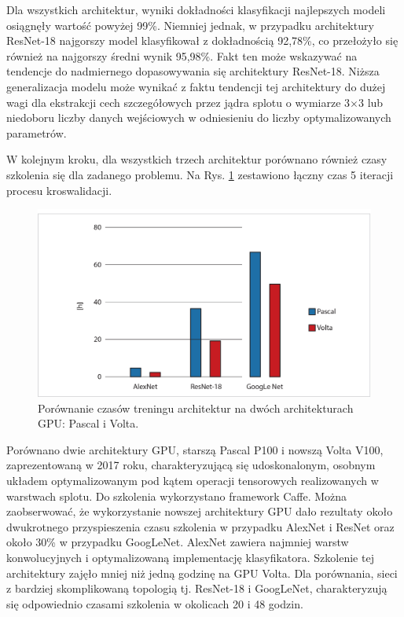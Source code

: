 Dla wszystkich architektur, wyniki dokładności klasyfikacji najlepszych modeli osiągnęły wartość powyżej 99\%. Niemniej jednak, w przypadku architektury ResNet-18 najgorszy model klasyfikował z dokładnością 92,78\%, co przełożyło się również na najgorszy średni wynik 95,98\%. Fakt ten może wskazywać na tendencje do nadmiernego dopasowywania się architektury ResNet-18. Niższa generalizacja modelu może wynikać z faktu tendencji tej architektury do dużej wagi dla ekstrakcji cech szczegółowych przez jądra splotu o wymiarze 3$\times$3 lub niedoboru liczby danych wejściowych w odniesieniu do liczby optymalizowanych parametrów.

W kolejnym kroku, dla wszystkich trzech architektur porównano również czasy szkolenia się dla zadanego problemu. Na Rys. \ref{fig:training_times} zestawiono łączny czas 5 iteracji procesu kroswalidacji.
\begin{figure}[h!]
	\includegraphics[width=\textwidth]{figures/TrainingtimesChart.jpg}
	\caption{Porównanie czasów treningu architektur na dwóch architekturach GPU: Pascal i Volta.}
	\label{fig:training_times}
\end{figure}
Porównano dwie architektury GPU, starszą Pascal P100 i nowszą Volta V100, zaprezentowaną w 2017 roku, charakteryzującą się udoskonalonym, osobnym układem optymalizowanym pod kątem operacji tensorowych realizowanych w warstwach splotu. Do szkolenia wykorzystano framework Caffe. Można zaobserwować, że wykorzystanie nowszej architektury GPU dało rezultaty około dwukrotnego przyspieszenia czasu szkolenia w przypadku AlexNet i ResNet oraz około 30\% w przypadku GoogLeNet. AlexNet zawiera najmniej warstw konwolucyjnych i optymalizowaną implementację klasyfikatora. Szkolenie tej architektury zajęło mniej niż jedną godzinę na GPU Volta. Dla porównania, sieci z bardziej skomplikowaną topologią tj. ResNet-18 i GoogLeNet, charakteryzują się odpowiednio czasami szkolenia w okolicach 20 i 48 godzin. 

